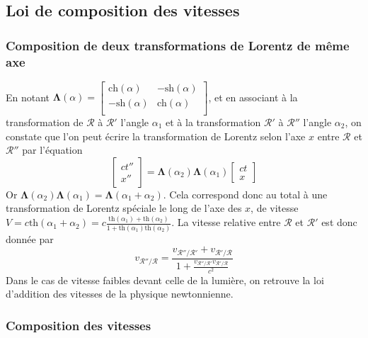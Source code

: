     \subsection{Loi de composition des vitesses}

        \subsubsection{Composition de deux transformations de Lorentz de même axe}

        En notant $\symbf{\Lambda}(\alpha) = \begin{bmatrix}
            \text{ch}(\alpha) & -\text{sh}(\alpha) \\
            - \text{sh}(\alpha) & \text{ch}(\alpha) \\
        \end{bmatrix}$, et en associant à la transformation de $\mathcal{R}$ à $\mathcal{R}'$ l’angle $\alpha_1$ et à la transformation $\mathcal{R}'$ à $\mathcal{R}''$ l’angle $\alpha_2$, on constate que l’on peut écrire la transformation de Lorentz selon l’axe $x$ entre $\mathcal{R}$ et $\mathcal{R}''$ par l’équation 
        \[ \begin{bmatrix}
            ct'' \\
            x''
        \end{bmatrix} = \symbf{\Lambda}(\alpha_2)\symbf{\Lambda}(\alpha_1) \begin{bmatrix}
            ct \\
            x
        \end{bmatrix} \]   
        Or $\symbf{\Lambda}(\alpha_2)\symbf{\Lambda}(\alpha_1) = \symbf{\Lambda}(\alpha_1 + \alpha_2)$. Cela correspond donc au total à une transformation de Lorentz spéciale le long de l’axe des $x$, de vitesse $V = c \text{th}(\alpha_1 + \alpha_2) = c \frac{\text{th}(\alpha_1) + \text{th}(\alpha_2)}{1 + \text{th}(\alpha_1)\text{th}(\alpha_2)}$. La vitesse relative entre $\mathcal{R}$ et $\mathcal{R}'$ est donc donnée par 
        \[ v_{\mathcal{R}''/\mathcal{R}} = \frac{v_{\mathcal{R}''/\mathcal{R}'} + v_{\mathcal{R}'/\mathcal{R}}}{1 + \frac{v_{\mathcal{R}''/\mathcal{R}'}v_{\mathcal{R}'/\mathcal{R}}}{c^2}} \]
        Dans le cas de vitesse faibles devant celle de la lumière, on retrouve la loi d’addition des vitesses de la physique newtonnienne.

        \subsubsection{Composition des vitesses}


